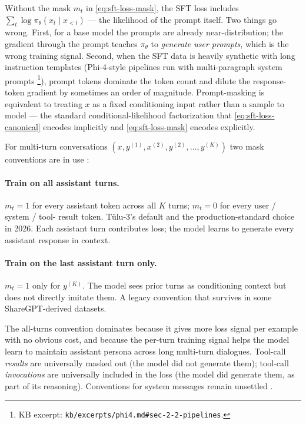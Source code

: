 Without the mask $m_t$ in \cref{eq:sft-loss-mask}, the SFT loss
includes $\sum_t \log \pi_\theta(x_t \mid x_{<t})$ — the likelihood of
the prompt itself. Two things go wrong. First, for a base model the
prompts are already near-distribution; the gradient through the prompt
teaches $\pi_\theta$ to \emph{generate user prompts}, which is the wrong
training signal. Second, when the SFT data is heavily synthetic with
long instruction templates (Phi-4-style pipelines run with
multi-paragraph system prompts \citep[\S 2.2]{phi4}\footnote{KB excerpt:
\texttt{kb/excerpts/phi4.md\#sec-2-2-pipelines}.}), prompt tokens
dominate the token count and dilute the response-token gradient by
sometimes an order of magnitude. Prompt-masking is equivalent to
treating $x$ as a fixed conditioning input rather than a sample to
model — the standard conditional-likelihood factorization that
\cref{eq:sft-loss-canonical} encodes implicitly and
\cref{eq:sft-loss-mask} encodes explicitly.

For multi-turn conversations $(x, y^{(1)}, x^{(2)}, y^{(2)}, \ldots,
y^{(K)})$ two mask conventions are in use \citep{tulu3}:

\paragraph{Train on all assistant turns.} $m_t = 1$ for every assistant
token across all $K$ turns; $m_t = 0$ for every user / system / tool-
result token. T\"ulu-3's default and the production-standard choice in
2026. Each assistant turn contributes loss; the model learns to
generate every assistant response in context.

\paragraph{Train on the last assistant turn only.} $m_t = 1$ only for
$y^{(K)}$. The model sees prior turns as conditioning context but does
not directly imitate them. A legacy convention that survives in some
ShareGPT-derived datasets.

The all-turns convention dominates because it gives more loss signal
per example with no obvious cost, and because the per-turn training
signal helps the model learn to maintain assistant persona across long
multi-turn dialogues. Tool-call \emph{results} are universally masked
out (the model did not generate them); tool-call \emph{invocations}
are universally included in the loss (the model did generate them, as
part of its reasoning). Conventions for system messages remain
unsettled .

